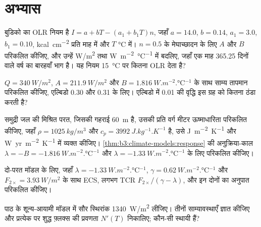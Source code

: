 \section{अभ्यास}

\begin{exercise}[$\star$]\label{exo:b3:climate-models:1}
बुडिको का OLR नियम है $I = a + bT - (a_1 + b_1T)n$, जहाँ $a = 14.0$, $b =
0.14$, $a_1 = 3.0$, $b_1 = 0.10$, \unit{kcal.cm^{-2}} प्रति माह में और $T$
\unit{\celsius} में। $n = 0.5$ के मेघाच्छादन के लिए $A$ और $B$ परिकलित कीजिए,
और उन्हें \unit{W/m^2} तथा \unit{W.m^{-2}.\celsius^{-1}} में बदलिए, जहाँ एक माह
365.25 दिनों वाले वर्ष का बारहवाँ भाग है। यह नियम
\qty{15}{\celsius} पर कितना OLR देता है?
\end{exercise}

\begin{exercise}[$\star$]\label{exo:b3:climate-models:2}
$Q = \qty{340}{W/m^2}$, $A = \qty{211.9}{W/m^2}$ और $B =
\qty{1.816}{W.m^{-2}.\celsius^{-1}}$ के साथ साम्य तापमान परिकलित कीजिए,
एल्बिडो 0.30 और 0.31 के लिए। एल्बिडो में 0.01 की वृद्धि
इस ग्रह को कितना ठंडा करती है?
\end{exercise}

\begin{exercise}[$\star$]\label{exo:b3:climate-models:3}
समुद्री जल की मिश्रित परत, जिसकी गहराई
\qty{60}{m} है, उसकी प्रति वर्ग मीटर ऊष्माधारिता परिकलित कीजिए, जहाँ $\rho = \qty{1025}{kg/m^3}$ और $c_p = \qty{3992}{J.kg^{-1}.K^{-1}}$ है,
उसे \unit{J.m^{-2}.K^{-1}} और \unit{W.yr.m^{-2}.K^{-1}} में व्यक्त कीजिए।
\cref{thm:b3:climate-models:response} की अनुक्रिया-काल $\lambda = -B =
\qty{-1.816}{W.m^{-2}.\celsius^{-1}}$ और $\lambda =
\qty{-1.33}{W.m^{-2}.\celsius^{-1}}$ के लिए परिकलित कीजिए।
\end{exercise}

\begin{exercise}[$\star$]\label{exo:b3:climate-models:4}
दो-परत मॉडल के लिए, जहाँ $\lambda = \qty{-1.33}{W.m^{-2}.\celsius^{-1}}$,
$\gamma = \qty{0.62}{W.m^{-2}.\celsius^{-1}}$ और $F_{2\times} =
\qty{3.93}{W/m^2}$ के साथ ECS, लगभग TCR $F_{2\times}/
(\gamma - \lambda)$, और इन दोनों का अनुपात परिकलित कीजिए।
\end{exercise}

\begin{exercise}[$\star\star$]\label{exo:b3:climate-models:5}
पाठ के शून्य-आयामी मॉडल में सौर स्थिरांक
\qty{1340}{W/m^2} लीजिए। तीनों साम्यावस्थाएँ ज्ञात कीजिए और प्रत्येक पर
शुद्ध फ़्लक्स की प्रवणता $N'(T)$ निकालिए; कौन-सी स्थायी हैं?
\end{exercise}

